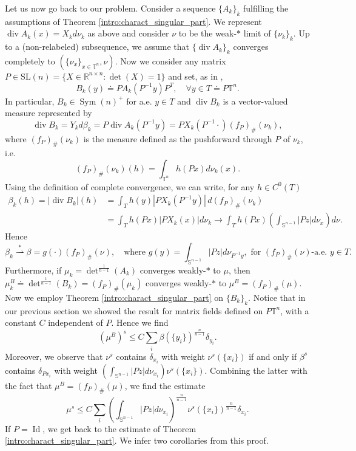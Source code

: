 \documentclass[10pt,reqno]{amsart}
\numberwithin{equation}{section}
\newcommand{\weak}{\overset{*}{\rightharpoonup}}
\newcommand{\R}{\mathbb{R}}
\newcommand{\T}{\mathbb{T}}
\DeclareMathOperator{\Id}{Id}
\DeclareMathOperator{\dv}{div}
\DeclareMathOperator{\Sym}{Sym}
\theoremstyle{plain}
\theoremstyle{definition}
\theoremstyle{remark}
\begin{document}
Let us now go back to our problem. Consider a sequence $\{A_k\}_k$ fulfilling the assumptions of Theorem \ref{intro:charact_singular_part}. We represent $\dv A_k(x) = X_kd\nu_k$ as above and consider $\nu$ to be the weak-$*$ limit of $\{\nu_k\}_k$. Up to a (non-relabeled) subsequence, we assume that $\{\dv A_k\}_k$ converges completely to $(\{\nu_x\}_{x \in \T^n},\nu)$. Now we consider any matrix $P \in \text{SL}(n) = \{X \in \R^{n\times n}: \det(X) = 1\}$ and set, as in \cite[Lemma 1.1]{SER},
\[
B_k(y) \doteq PA_k(P^{-1}y)P^T, \quad \forall y \in T \doteq P\T^n.
\]
In particular, $B_k \in \Sym(n)^+$ for a.e. $y \in T$ and $\dv B_k$ is a vector-valued measure represented by
\[
\dv B_k = Y_kd\beta_k = P\dv A_k(P^{-1}y) =PX_k(P^{-1}\cdot) (f_P)_{\#}(\nu_k),
\]
where $(f_P)_{\#}(\nu_k)$ is the measure defined as the pushforward through $P$ of $\nu_k$, i.e.
\[
(f_P)_{\#}(\nu_k)(h) = \int_{\T^n}h(Px)d\nu_k(x). 
\]
Using the definition of complete convergence, we can write, for any $h \in C^0(T)$
\begin{align*}
\beta_k(h) = |\dv B_k| (h) &= \int_{T}h(y)\left|PX_k(P^{-1}y)\right| \,d(f_P)_{\#}(\nu_k) \\
&= \int_Th(Px)|PX_k(x)|d\nu_k \to \int_{T}h(Px) \left(\int_{\mathbb{S}^{n-1}}|Pz|d\nu_x\right)d\nu.
\end{align*}
Hence
\begin{equation}\label{carbeta}
\beta_k \weak \beta = g(\cdot)(f_P)_{\#}(\nu), \quad \text{where }g(y) = \int_{\mathbb{S}^{n-1}}|Pz|d\nu_{P^{-1}y}, \text{ for $(f_P)_{\#}(\nu)$-a.e. } y \in T. 
\end{equation}
Furthermore, if $\mu_k = \det^{\frac{1}{n - 1}}(A_k)$ converges weakly-$*$ to $\mu$, then $\mu_k^B \doteq  \det^{\frac{1}{n - 1}}(B_k) =  (f_P)_{\#}(\mu_k)$ converges weakly-$*$ to $\mu^B = (f_P)_{\#}(\mu)$. Now we employ Theorem \ref{intro:charact_singular_part} on $\{B_k\}_k$. Notice that in our previous section we showed the result for matrix fields defined on $P\T^n$, with a constant $C$ independent of $P$. Hence we find
\[
(\mu^B)^s \le C\sum_{i}\beta(\{y_i\})^\frac{n}{n - 1}\delta_{y_i}.
\]
Moreover, we observe that $\nu^s$ contains $\delta_{x_i}$ with weight $\nu^s(\{x_i\})$ if and only if $\beta^s$ contains $\delta_{Px_i}$ with weight $\left(\int_{\mathbb{S}^{n-1}}|Pz|d\nu_{x_i}\right)\nu^s(\{x_i\})$. Combining the latter with the fact that $\mu^B = (f_P)_{\#}(\mu)$, we find the estimate
\[
\mu^s \le C\sum_{i}\left(\int_{\mathbb{S}^{n-1}}|Pz|d\nu_{x_i}\right)^\frac{n}{n - 1}\nu^s(\{x_i\})^\frac{n}{n - 1}\delta_{x_i}.
\]
If $P = \Id$, we get back to the estimate of Theorem \ref{intro:charact_singular_part}. We infer two corollaries from this proof.
\end{document}
